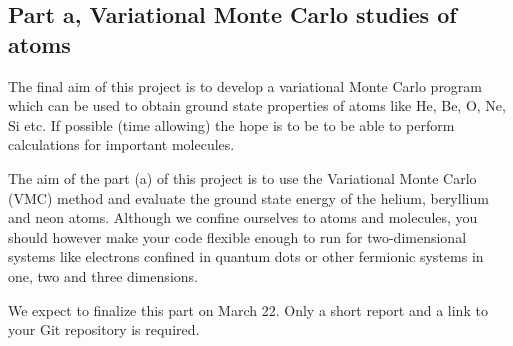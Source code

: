 \subsection*{Part a, Variational Monte Carlo studies of atoms}

The final aim of this project is to develop a variational Monte Carlo program which can be used to obtain ground state properties of atoms like He, Be, O, Ne, Si etc. If possible (time allowing) the hope is to be to be able to perform calculations for important molecules.

The aim of the part (a) of this  project is to use the Variational Monte Carlo (VMC) method and evaluate the ground state energy of the helium, beryllium and neon atoms. Although we confine ourselves to atoms and molecules, you should however make your code flexible enough to run for two-dimensional systems like electrons confined in quantum dots or other fermionic systems in one, two and three dimensions.

We expect to finalize this part on March 22. Only a short report and a link to your Git repository is required.
